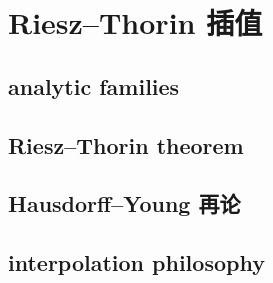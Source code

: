 \section{Riesz–Thorin 插值}
\label{b2:sec:1704}


\subsection{analytic families}
\label{b2:subsec:170401}

\subsection{Riesz–Thorin theorem}
\label{b2:subsec:170402}

\subsection{Hausdorff–Young 再论}
\label{b2:subsec:170403}

\subsection{interpolation philosophy}
\label{b2:subsec:170404}


